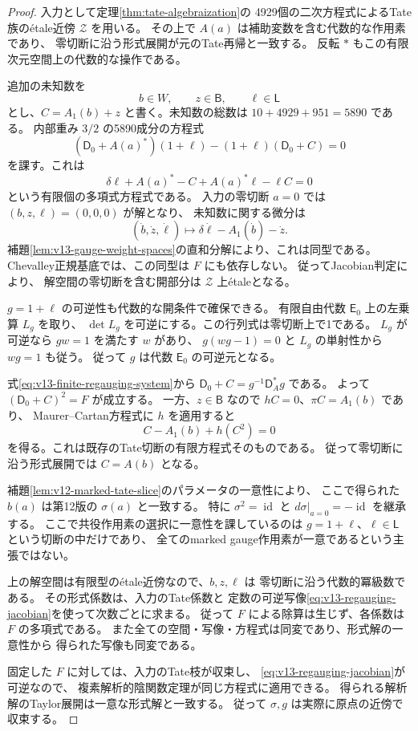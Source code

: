 \begin{proof}
入力として定理\ref{thm:tate-algebraization}の
4929個の二次方程式によるTate族の\'etale近傍 $\mathcal Z$ を用いる。
その上で $A(a)$ は補助変数を含む代数的な作用素であり、
零切断に沿う形式展開が元のTate再帰と一致する。
反転 $*$ もこの有限次元空間上の代数的な操作である。

追加の未知数を
\[
 b\in W,\qquad z\in\mathsf B,\qquad \ell\in\mathsf L
\]
とし、$C=A_1(b)+z$ と書く。未知数の総数は
$10+4929+951=5890$ である。
内部重み $3/2$ の5890成分の方程式
\begin{equation}\label{eq:v13-finite-regauging-system}
 (\mathsf D_0+A(a)^*)(1+\ell)
       -(1+\ell)(\mathsf D_0+C)=0
\end{equation}
を課す。これは
\[
 \delta\ell+A(a)^*-C+A(a)^*\ell-\ell C=0
\]
という有限個の多項式方程式である。
入力の零切断 $a=0$ では $(b,z,\ell)=(0,0,0)$ が解となり、
未知数に関する微分は
\begin{equation}\label{eq:v13-regauging-jacobian}
 (\dot b,\dot z,\dot\ell)
   \longmapsto\delta\dot\ell-A_1(\dot b)-\dot z.
\end{equation}
補題\ref{lem:v13-gauge-weight-spaces}の直和分解により、これは同型である。
Chevalley正規基底では、この同型は $F$ にも依存しない。
従ってJacobian判定\cite[Proposition 59.26.2(3)]{StacksEtaleCriterion}により、
解空間の零切断を含む開部分は
$\mathcal Z$ 上\'etaleとなる。

$g=1+\ell$ の可逆性も代数的な開条件で確保できる。
有限自由代数 $\mathsf E_0$ 上の左乗算 $L_g$ を取り、
$\det L_g$ を可逆にする。この行列式は零切断上で1である。
$L_g$ が可逆なら $gw=1$ を満たす $w$ があり、
$g(wg-1)=0$ と $L_g$ の単射性から $wg=1$ も従う。
従って $g$ は代数 $\mathsf E_0$ の可逆元となる。

式\eqref{eq:v13-finite-regauging-system}から
$\mathsf D_0+C=g^{-1}\mathsf D_A^*g$ である。
よって $(\mathsf D_0+C)^2=F$ が成立する。
一方、$z\in\mathsf B$ なので $hC=0$、$\pi C=A_1(b)$ であり、
Maurer--Cartan方程式に $h$ を適用すると
\[
 C-A_1(b)+h(C^2)=0
\]
を得る。これは既存のTate切断の有限方程式そのものである。
従って零切断に沿う形式展開では $C=A(b)$ となる。

補題\ref{lem:v12-marked-tate-slice}のパラメータの一意性により、
ここで得られた $b(a)$ は第12版の $\sigma(a)$ と一致する。
特に $\sigma^2=\operatorname{id}$ と
$d\sigma|_{a=0}=-\operatorname{id}$ を継承する。
ここで共役作用素の選択に一意性を課しているのは
$g=1+\ell$、$\ell\in\mathsf L$ という切断の中だけであり、
全てのmarked gauge作用素が一意であるという主張ではない。

上の解空間は有限型の\'etale近傍なので、$b,z,\ell$ は
零切断に沿う代数的冪級数である。
その形式係数は、入力のTate係数と
定数の可逆写像\eqref{eq:v13-regauging-jacobian}を使って次数ごとに求まる。
従って $F$ による除算は生じず、各係数は $F$ の多項式である。
また全ての空間・写像・方程式は同変であり、形式解の一意性から
得られた写像も同変である。

固定した $F$ に対しては、入力のTate枝が収束し、
\eqref{eq:v13-regauging-jacobian}が可逆なので、
複素解析的陰関数定理が同じ方程式に適用できる。
得られる解析解のTaylor展開は一意な形式解と一致する。
従って $\sigma,g$ は実際に原点の近傍で収束する。
\end{proof}

